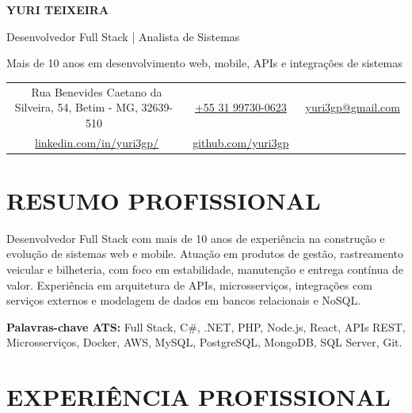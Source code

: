 \documentclass[11pt,a4paper]{article}
\begin{document}
\begin{center}
    {\huge\bfseries\color{darkblue} YURI TEIXEIRA}
    \vspace{8pt}
    
    {\large Desenvolvedor Full Stack | Analista de Sistemas}
    \vspace{4pt}
    
    {\color{darkgray} Mais de 10 anos em desenvolvimento web, mobile, APIs e integrações de sistemas}
    \vspace{12pt}
    
    \begin{tabular}{c c c}
        \ Rua Benevides Caetano da Silveira, 54, Betim - MG, 32639-510 & 
        \ \href{https://wa.me/5531997300623}{+55 31 99730-0623} & 
        \ \href{mailto:yuri3gp@gmail.com}{yuri3gp@gmail.com} \\
        \ \href{https://www.linkedin.com/in/yuri3gp/}{linkedin.com/in/yuri3gp/} & 
        \ \href{https://github.com/yuri3gp}{github.com/yuri3gp}
    \end{tabular}
\end{center}

\section{RESUMO PROFISSIONAL}

Desenvolvedor Full Stack com mais de 10 anos de experiência na construção e evolução de sistemas web e mobile.
Atuação em produtos de gestão, rastreamento veicular e bilheteria, com foco em estabilidade, manutenção e entrega contínua de valor.
Experiência em arquitetura de APIs, microsserviços, integrações com serviços externos e modelagem de dados em bancos relacionais e NoSQL.

\vspace{6pt}
\textbf{Palavras-chave ATS:} Full Stack, C\#, .NET, PHP, Node.js, React, APIs REST, Microsserviços, Docker, AWS, MySQL, PostgreSQL, MongoDB, SQL Server, Git.

\vspace{20pt}

\section{EXPERIÊNCIA PROFISSIONAL}
\end{document}
